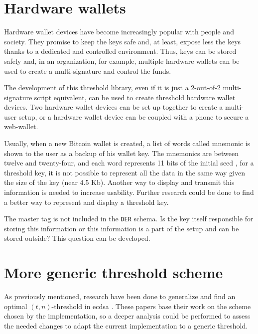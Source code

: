 \section{Hardware wallets}

Hardware wallet devices have become increasingly popular with people and
society. They promise to keep the keys safe and, at least, expose less the keys
thanks to a dedicated and controlled environment. Thus, keys can be stored
safely and, in an organization, for example, multiple hardware wallets can be
used to create a multi-signature and control the funds.

The development of this threshold library, even if it is just a 2-out-of-2
multi-signature script equivalent, can be used to create threshold hardware
wallet devices. Two hardware wallet devices can be set up together to create a
multi-user setup, or a hardware wallet device can be coupled with a phone to
secure a web-wallet.

Usually, when a new Bitcoin wallet is created, a list of words called mnemonic
is shown to the user as a backup of his wallet key. The mnemonics are between
twelve and twenty-four, and each word represents 11 bits of the initial seed
\cite{Mnemonic}, for a threshold key, it is not possible to represent all the
data in the same way given the size of the key (near 4.5 Kb). Another way to
display and transmit this information is needed to increase usability. Further
research could be done to find a better way to represent and display a threshold
key.

The master tag is not included in the \texttt{DER} schema. Is the key itself
responsible for storing this information or this information is a part of the
setup and can be stored outside? This question can be developed.

\section{More generic threshold scheme}

As previously mentioned, research have been done to generalize and find an
optimal $(t, n)$-threshold in \gls{ecdsa} \cite{10.1007/BFb0052253,
10.1007/978-3-642-27954-6_20}. These papers base their work on the scheme chosen
by the implementation, so a deeper analysis could be performed to assess the
needed changes to adapt the current implementation to a generic threshold.

